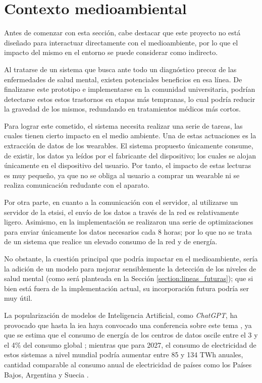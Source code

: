 \section{Contexto medioambiental}

    Antes de comenzar con esta sección, cabe destacar que este proyecto no está diseñado para interactuar directamente con el medioambiente, por lo que el impacto del mismo en el entorno se puede considerar como indirecto.

    Al tratarse de un sistema que busca ante todo un diagnóstico precoz de las enfermedades de salud mental, existen potenciales beneficios en esa línea. De finalizarse este prototipo e implementarse en la comunidad universitaria, podrían detectarse estos estos trastornos en etapas más tempranas, lo cual podría reducir la gravedad de los mismos, redundando en tratamientos médicos más cortos.

    Para lograr este cometido, el sistema necesita realizar una serie de tareas, las cuales tienen cierto impacto en el medio ambiente. Una de estas actuaciones es la extracción de datos de los \glspl{wearable}. El sistema propuesto únicamente consume, de existir, los datos ya leídos por el fabricante del dispositivo; los cuales se alojan únicamente en el dispositivo del usuario. Por tanto, el impacto de estas lecturas es muy pequeño, ya que no se obliga al usuario a comprar un \gls{wearable} ni se realiza comunicación redudante con el aparato.

    Por otra parte, en cuanto a la comunicación con el servidor, al utilizarse un servidor de la \gls{etsisi}, el envío de los datos a través de la red es relativamente ligero. Asimismo, en la implementación se realizaron una serie de optimizaciones para enviar únicamente los datos necesarios cada 8 horas; por lo que no se trata de un sistema que realice un elevado consumo de la red y de energía.

    No obstante, la cuestión principal que podría impactar en el medioambiente, sería la adición de un modelo para mejorar sensiblemente la detección de los niveles de salud mental (como será planteada en la Sección \ref{section:lineas_futuras}); que si bien está fuera de la implementación actual, su incorporación futura podría ser muy útil. 
    
    La popularización de modelos de Inteligencia Artificial, como \textit{ChatGPT}, ha provocado que hasta la \gls{iea} haya convocado una conferencia sobre este tema \cite{perez_demanda_2024}, ya que se estima que el consumo de energía de los centros de datos oscile entre el 3 y el 4\% del consumo global \cite{gijon_inteligencia_2024}; mientras que para 2027, el consumo de electricidad de estos sistemas a nivel mundial podría aumentar entre 85 y 134 TWh anuales, cantidad comparable al consumo anual de electricidad de países como los Países Bajos, Argentina y Suecia \cite{redaccion_inteligencia_2023}.
    
